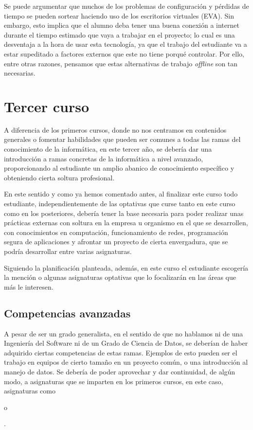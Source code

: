 Se puede argumentar que muchos de los problemas de configuración y pérdidas de tiempo se pueden sortear
haciendo uso de los escritorios virtuales (EVA). Sin embargo, esto implica que el alumno deba 
tener una buena conexión a internet durante el tiempo estimado que vaya a trabajar en el proyecto; 
lo cual es una desventaja a la hora de usar esta tecnología, ya que el trabajo del estudiante 
va a estar supeditado a factores externos que este no tiene porqué controlar. Por ello, entre 
otras razones, pensamos que estas alternativas de trabajo \textit{offline} son tan necesarias.


\section{Tercer curso}
A diferencia de los primeros cursos, donde no nos centramos en contenidos generales 
o fomentar habilidades que pueden ser comunes a todas las ramas del conocimiento de 
la informática, en este tercer año, se debería dar una introducción a ramas concretas 
de la informática a nivel avanzado, proporcionando al estudiante un amplio abanico de 
conocimiento específico y obteniendo cierta soltura profesional.

En este sentido y como ya hemos comentado antes, al finalizar este curso todo estudiante, 
independientemente de las optativas que curse tanto en este curso como en los posteriores, 
debería tener la base necesaria para poder realizar unas prácticas externas con soltura 
en la empresa u organismo en el que se desarrollen, con conocimientos en computación, 
funcionamiento de redes, programación segura de aplicaciones y afrontar un proyecto de 
cierta envergadura, que se podría desarrollar entre varias asignaturas.

Siguiendo la planificación planteada, además, en este curso el estudiante escogería la mención 
o algunas asignaturas optativas que lo focalizarán en las áreas que más le interesen.

\subsection{Competencias avanzadas}
A pesar de ser un grado generalista, en el sentido de que no hablamos ni de una Ingeniería 
del Software ni de un Grado de Ciencia de Datos, se deberían de haber adquirido ciertas
competencias de estas ramas. Ejemplos de esto pueden ser el trabajo en equipos de cierto 
tamaño en un proyecto común, o una introducción al manejo de datos.
Se debería de poder aprovechar y dar continuidad, de algún modo, a asignaturas que se 
imparten en los primeros cursos, en este caso, asignaturas como \subject{Estadística} o 
\subject{Bases de Datos}.

